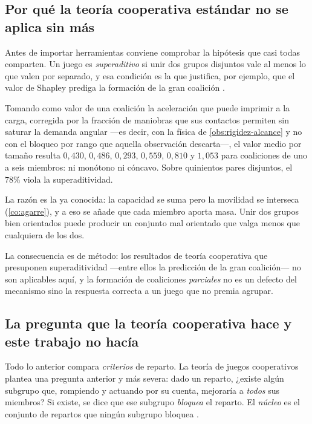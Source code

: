 \subsection{Por qué la teoría cooperativa estándar no se aplica sin más}

Antes de importar herramientas conviene comprobar la hipótesis que casi todas
comparten. Un juego es \emph{superaditivo} si unir dos grupos disjuntos vale al
menos lo que valen por separado, y esa condición es la que justifica, por
ejemplo, que el valor de Shapley prediga la formación de la gran coalición
\cite{okada2026games}.

\begin{observacion}
\label{obs:no-superaditivo}
Tomando como valor de una coalición la aceleración que puede imprimir a la
carga, corregida por la fracción de maniobras que sus contactos permiten sin
saturar la demanda angular —es decir, con la física de
\cref{obs:rigidez-alcance} y no con el bloqueo por rango que aquella observación
descarta—, el valor medio por tamaño resulta $0{,}430$, $0{,}486$, $0{,}293$,
$0{,}559$, $0{,}810$ y $1{,}053$ para coaliciones de uno a seis miembros: ni
monótono ni cóncavo. Sobre quinientos pares disjuntos, el $78\%$ viola la
superaditividad.

La razón es la ya conocida: la capacidad se suma pero la movilidad se interseca
(\cref{co:agarre}), y a eso se añade que cada miembro aporta masa. Unir dos
grupos bien orientados puede producir un conjunto mal orientado que valga menos
que cualquiera de los dos.

La consecuencia es de método: los resultados de teoría cooperativa que presuponen
superaditividad —entre ellos la predicción de la gran coalición— no son
aplicables aquí, y la formación de coaliciones \emph{parciales} no es un defecto
del mecanismo sino la respuesta correcta a un juego que no premia agrupar.
\end{observacion}

\subsection{La pregunta que la teoría cooperativa hace y este trabajo no hacía}

Todo lo anterior compara \emph{criterios} de reparto. La teoría de juegos
cooperativos plantea una pregunta anterior y más severa: dado un reparto,
¿existe algún subgrupo que, rompiendo y actuando por su cuenta, mejoraría a
\emph{todos} sus miembros? Si existe, se dice que ese subgrupo \emph{bloquea} el
reparto. El \emph{núcleo} es el conjunto de repartos que ningún subgrupo bloquea
\cite{okada2026games}.

